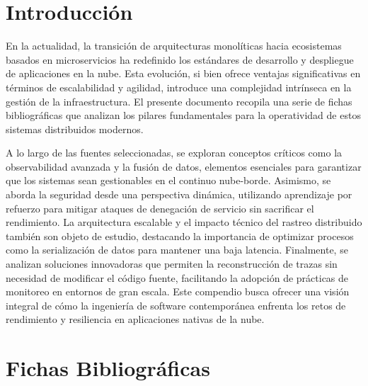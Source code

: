 \documentclass[12pt]{article}
\begin{document}
\newpage
\tableofcontents
\newpage

\section{Introducción}
\pagestyle{plain}
En la actualidad, la transición de arquitecturas monolíticas hacia ecosistemas basados en microservicios ha redefinido los estándares de desarrollo y despliegue de aplicaciones en la nube. Esta evolución, si bien ofrece ventajas significativas en términos de escalabilidad y agilidad, introduce una complejidad intrínseca en la gestión de la infraestructura. El presente documento recopila una serie de fichas bibliográficas que analizan los pilares fundamentales para la operatividad de estos sistemas distribuidos modernos.

A lo largo de las fuentes seleccionadas, se exploran conceptos críticos como la observabilidad avanzada y la fusión de datos, elementos esenciales para garantizar que los sistemas sean gestionables en el continuo nube-borde. Asimismo, se aborda la seguridad desde una perspectiva dinámica, utilizando aprendizaje por refuerzo para mitigar ataques de denegación de servicio sin sacrificar el rendimiento. La arquitectura escalable y el impacto técnico del rastreo distribuido también son objeto de estudio, destacando la importancia de optimizar procesos como la serialización de datos para mantener una baja latencia. Finalmente, se analizan soluciones innovadoras que permiten la reconstrucción de trazas sin necesidad de modificar el código fuente, facilitando la adopción de prácticas de monitoreo en entornos de gran escala. Este compendio busca ofrecer una visión integral de cómo la ingeniería de software contemporánea enfrenta los retos de rendimiento y resiliencia en aplicaciones nativas de la nube.

\newpage


\section{Fichas Bibliográficas}
\end{document}
